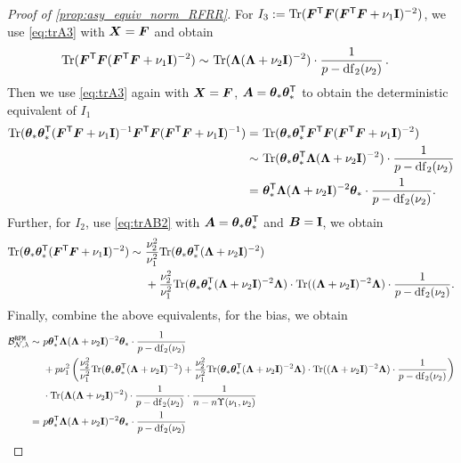 \begin{proof}[Proof of \cref{prop:asy_equiv_norm_RFRR}]
For $I_3:= {\rm Tr}({\boldsymbol F}^{\mathsf T} {\boldsymbol F} ( {\boldsymbol F}^{\mathsf T} {\boldsymbol F} + \nu_1{\mathbf I})^{-2})$, we use \cref{eq:trA3} with ${\boldsymbol X}={\boldsymbol F}$ and obtain
\begin{align}\label{eq:I3}
{\rm Tr}({\boldsymbol F}^{\mathsf T} {\boldsymbol F} ( {\boldsymbol F}^{\mathsf T} {\boldsymbol F} + \nu_1{\mathbf I})^{-2}) \sim&~ {\rm Tr}({\boldsymbol \Lambda}({\boldsymbol \Lambda} + \nu_2{\mathbf I})^{-2}) \cdot \frac{1}{p - {\rm df}_2(\nu_2)}\,.
\end{align}
Then we use \cref{eq:trA3} again with ${\boldsymbol X}={\boldsymbol F}$, ${\boldsymbol A} = {\boldsymbol \theta}_*{\boldsymbol \theta}_*^{\mathsf T}$ to obtain the deterministic equivalent of $I_1$
\[
\begin{aligned}
{\rm Tr}({\boldsymbol \theta}_* {\boldsymbol \theta}_*^{\mathsf T} ( {\boldsymbol F}^{\mathsf T} {\boldsymbol F} + \nu_1{\mathbf I})^{-1} {\boldsymbol F}^{\mathsf T} {\boldsymbol F} ( {\boldsymbol F}^{\mathsf T} {\boldsymbol F} + \nu_1{\mathbf I})^{-1}) =&~ {\rm Tr}({\boldsymbol \theta}_* {\boldsymbol \theta}_*^{\mathsf T} {\boldsymbol F}^{\mathsf T} {\boldsymbol F} ( {\boldsymbol F}^{\mathsf T} {\boldsymbol F} + \nu_1{\mathbf I})^{-2})\\
\sim&~ {\rm Tr}({\boldsymbol \theta}_* {\boldsymbol \theta}_*^{\mathsf T} {\boldsymbol \Lambda} ( {\boldsymbol \Lambda} + \nu_2{\mathbf I})^{-2}) \cdot \frac{1}{p - {\rm df}_2(\nu_2)}\\
=&~ {\boldsymbol \theta}_*^{\mathsf T} {\boldsymbol \Lambda} ( {\boldsymbol \Lambda} + \nu_2{\mathbf I})^{-2} {\boldsymbol \theta}_* \cdot \frac{1}{p - {\rm df}_2(\nu_2)}.
\end{aligned}
\]
Further, for $I_2$, use \cref{eq:trAB2} with ${\boldsymbol A}={\boldsymbol \theta}_*{\boldsymbol \theta}_*^{\mathsf T}$ and ${\boldsymbol B}={\mathbf I}$, we obtain
\[
\begin{aligned}
{\rm Tr}({\boldsymbol \theta}_* {\boldsymbol \theta}_*^{\mathsf T} ( {\boldsymbol F}^{\mathsf T} {\boldsymbol F} + \nu_1{\mathbf I})^{-2}) \sim&~ \frac{\nu_2^2}{\nu_1^2}{\rm Tr}({\boldsymbol \theta}_* {\boldsymbol \theta}_*^{\mathsf T} ({\boldsymbol \Lambda} + \nu_2{\mathbf I})^{-2})\\
&~+ \frac{\nu_2^2}{\nu_1^2}{\rm Tr}({\boldsymbol \theta}_* {\boldsymbol \theta}_*^{\mathsf T} ({\boldsymbol \Lambda} + \nu_2{\mathbf I})^{-2} {\boldsymbol \Lambda}) \cdot {\rm Tr}( ({\boldsymbol \Lambda} + \nu_2{\mathbf I})^{-2} {\boldsymbol \Lambda}) \cdot \frac{1}{p - {\rm df}_2(\nu_2)}.
\end{aligned}
\]
Finally, combine the above equivalents, for the bias, we obtain
\[
\begin{aligned}
    \mathcal{B}_{\mathcal{N},\lambda}^{\tt RFM} \sim&~ p \btheta_*^\sT \bLambda ( \bLambda + \nu_2\id)^{-2} \btheta_* \cdot \frac{1}{p - {\rm df}_2(\nu_2)}\\
    &~+ p \nu_1^2 \left(\frac{\nu_2^2}{\nu_1^2}\Tr(\btheta_* \btheta_*^\sT (\bLambda + \nu_2\id)^{-2}) + \frac{\nu_2^2}{\nu_1^2}\Tr(\btheta_* \btheta_*^\sT (\bLambda + \nu_2\id)^{-2} \bLambda) \cdot \Tr( (\bLambda + \nu_2\id)^{-2} \bLambda) \cdot \frac{1}{p - {\rm df}_2(\nu_2)} \right)\\
    &~\cdot \Tr(\bLambda(\bLambda + \nu_2\id)^{-2}) \cdot \frac{1}{p - {\rm df}_2(\nu_2)} \cdot \frac{1}{n - n\Upsilon(\nu_1, \nu_2)}\\
    =&~ p\btheta_*^\sT \bLambda ( \bLambda + \nu_2\id)^{-2} \btheta_* \cdot \frac{1}{p - {\rm df}_2(\nu_2)}\\

\end{aligned}\]
\end{proof}

